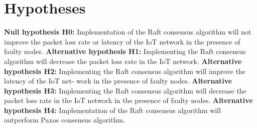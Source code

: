 \documentclass[oneside,12pt]{book}
\begin{document}
\section{Hypotheses}
\textbf{Null hypothesis H0: }\smallskip \newline
Implementation of the Raft consensus algorithm will not improve the packet loss rate or latency of the IoT network in the presence of faulty nodes.\smallskip \newline
\textbf{Alternative hypothesis H1: }\smallskip \newline
Implementing the Raft consensus algorithm will decrease the packet loss rate in the IoT network.\smallskip \newline
\textbf{Alternative hypothesis H2: }\smallskip \newline
Implementing the Raft consensus algorithm will improve the latency of the IoT net- work in the presence of faulty nodes.\smallskip \newline 
\textbf{Alternative hypothesis H3: }\smallskip \newline
Implementing the Raft consensus algorithm will decrease the packet loss rate in the IoT network in the presence of faulty nodes.\smallskip \newline
\textbf{Alternative hypothesis H4:  }\smallskip \newline
Implementation of the Raft consensus algorithm will outperform Paxos consensus algorithm.
\end{document}
